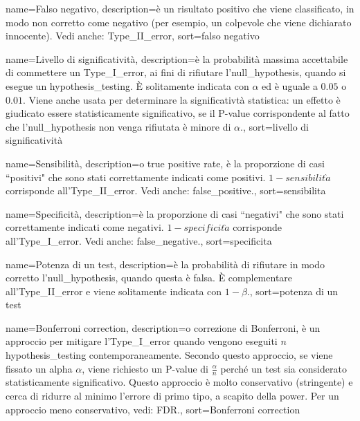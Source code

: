 {
	 name={Falso negativo},
	 description={\`e un risultato positivo che viene classificato, in modo non corretto come negativo (per esempio, un colpevole che viene dichiarato innocente). Vedi anche: \gls{Type_II_error}},
	 sort={falso negativo}
}

{
	 name={Livello di significativit\`a},
	 description={\`e la probabilit\`a massima accettabile di commettere un \gls{Type_I_error}, ai fini di rifiutare l'\gls{null_hypothesis}, quando si esegue un \gls{hypothesis_testing}. \`E  solitamente indicata con $\alpha$ ed \`e uguale a $0.05$ o $0.01$. Viene anche usata per determinare la significativt\`a statistica: un effetto \`e giudicato essere statisticamente significativo, se il \gls{P-value} corrispondente al fatto che l'\gls{null_hypothesis} non venga rifiutata \`e minore di $\alpha$.},
	 sort={livello di significativit\`a}
}

{
	 name={Sensibilit\`a},
	 description={o true positive rate, \`e la proporzione di casi ``positivi" che sono stati correttamente indicati come positivi. $1-sensibilit\grave{a}$ corrisponde all'\gls{Type_II_error}. Vedi anche: \gls{false_positive}.},
	 sort={sensibilita}
}

{
	 name={Specificit\`a},
	 description={\`e la proporzione di casi ``negativi" che sono stati correttamente indicati come negativi. $ 1-specificit\grave{a}$ corrisponde all'\gls{Type_I_error}. Vedi anche: \gls{false_negative}.},
	 sort={specificita}
}

{
	 name={Potenza di un test},
	 description={\`e la probabilit\`a di rifiutare in modo corretto l'\gls{null_hypothesis}, quando questa \`e falsa. \`E complementare all'\gls{Type_II_error} e viene solitamente indicata con $1 - \beta$.},
	 sort={potenza di un test}
}

{
	 name={Bonferroni correction},
	 description={o correzione di Bonferroni, \`e un approccio per mitigare l'\gls{Type_I_error} quando vengono eseguiti $n$ \gls{hypothesis_testing} contemporaneamente. Secondo questo approccio, se viene fissato un \gls{alpha} $\alpha$, viene richiesto un \gls{P-value} di $\frac{\alpha}{n}$ perch\'e un test sia considerato statisticamente significativo. Questo approccio \`e molto conservativo (stringente) e cerca di ridurre al minimo l'errore di primo tipo, a scapito della \gls{power}. Per un approccio meno conservativo, vedi: \gls{FDR}.},
	 sort={Bonferroni correction}
}

